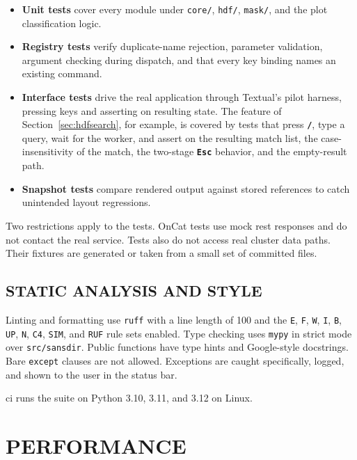 \documentclass[tm]{ornltm}
\newcommand{\key}[1]{\textbf{\texttt{#1}}}
\begin{document}
\begin{itemize}
  \item \textbf{Unit tests} cover every module under \texttt{core/},
    \texttt{hdf/}, \texttt{mask/}, and the plot classification logic.
  \item \textbf{Registry tests} verify duplicate-name rejection, parameter
    validation, argument checking during dispatch, and that every key binding
    names an existing command.
  \item \textbf{Interface tests} drive the real application through Textual's
    pilot harness, pressing keys and asserting on resulting state. The feature of
    Section~\ref{sec:hdfsearch}, for example, is covered by tests that press
    \key{/}, type a query, wait for the worker, and assert on the resulting
    match list, the case-insensitivity of the match, the two-stage \key{Esc}
    behavior, and the empty-result path.
  \item \textbf{Snapshot tests} compare rendered output against stored
    references to catch unintended layout regressions.
\end{itemize}

Two restrictions apply to the tests. OnCat tests use mock \ac{rest} responses
and do not contact the real service. Tests also do not access real cluster data
paths. Their fixtures are generated or taken from a small set of committed
files.

\subsection{STATIC ANALYSIS AND STYLE}

Linting and formatting use \texttt{ruff} with a line length of 100 and the
\texttt{E}, \texttt{F}, \texttt{W}, \texttt{I}, \texttt{B}, \texttt{UP},
\texttt{N}, \texttt{C4}, \texttt{SIM}, and \texttt{RUF} rule sets enabled.
Type checking uses \texttt{mypy} in strict mode over \texttt{src/sansdir}.
Public functions have type hints and Google-style docstrings. Bare
\texttt{except} clauses are not allowed. Exceptions are caught specifically,
logged, and shown to the user in the status bar.

\Ac{ci} runs the suite on Python 3.10, 3.11, and 3.12 on Linux.

\section{PERFORMANCE}
\label{sec:perf}
\end{document}
